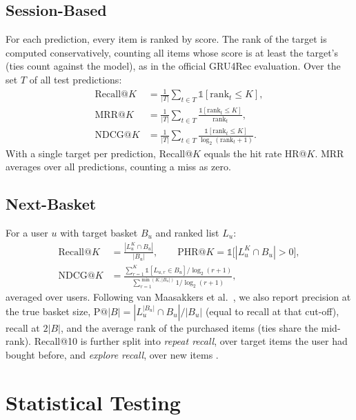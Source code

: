 \subsection{Session-Based}

For each prediction, every item is ranked by score. The rank of the target is
computed conservatively, counting all items whose score is at least the target's
(ties count against the model), as in the official GRU4Rec evaluation. Over the
set $T$ of all test predictions:
\begin{align}
\mathrm{Recall@}K &= \frac{1}{|T|} \sum_{t \in T} \mathbb{1}[\mathrm{rank}_t \le K], \\
\mathrm{MRR@}K &= \frac{1}{|T|} \sum_{t \in T} \frac{\mathbb{1}[\mathrm{rank}_t \le K]}{\mathrm{rank}_t}, \\
\mathrm{NDCG@}K &= \frac{1}{|T|} \sum_{t \in T} \frac{\mathbb{1}[\mathrm{rank}_t \le K]}{\log_2(\mathrm{rank}_t + 1)}.
\end{align}
With a single target per prediction, Recall@$K$ equals the hit rate HR@$K$. MRR
averages over all predictions, counting a miss as zero.

\subsection{Next-Basket}

For a user $u$ with target basket $B_u$ and ranked list $L_u$:
\begin{align}
\mathrm{Recall@}K &= \frac{|L_u^{K} \cap B_u|}{|B_u|}, \qquad
\mathrm{PHR@}K = \mathbb{1}\big[|L_u^{K} \cap B_u| > 0\big], \\
\mathrm{NDCG@}K &= \frac{\sum_{r=1}^{K} \mathbb{1}[L_{u,r} \in B_u] / \log_2(r+1)}{\sum_{r=1}^{\min(K, |B_u|)} 1/\log_2(r+1)},
\end{align}
averaged over users. Following van Maasakkers et al.\ \cite{vanmaasakkers2023},
we also report precision at the true basket size, $\mathrm{P@}|B| = |L_u^{|B_u|} \cap B_u| / |B_u|$
(equal to recall at that cut-off), recall at $2|B|$, and the average rank of the
purchased items (ties share the mid-rank). Recall@10 is further split into
\emph{repeat recall}, over target items the user had bought before, and
\emph{explore recall}, over new items \cite{li2023}.

\section{Statistical Testing}

